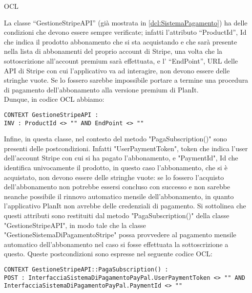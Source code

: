 \begin{listaPersonale}{OCL}
    \begin{center}
        
    \end{center}
    La classe “GestioneStripeAPI” (già mostrata in \ref{dcl:SistemaPagamento}) ha delle condizioni che devono essere sempre verificate; infatti l'attributo “ProductId”, Id che indica il prodotto abbonamento che si sta acquistando e che sarà presente nella lista di abbonamenti del proprio account di Stripe, una volta che la sottoscrizione all'account premium sarà effettuata, e l' “EndPoint”, URL delle API di Stripe con cui l'applicativo va ad interagire, non devono essere delle stringhe vuote. Se lo fossero sarebbe impossibile portare a termine una procedura di pagamento dell'abbonamento alla versione premium di PlanIt. \\
    Dunque, in codice OCL abbiamo:
    \begin{lstlisting}
CONTEXT GestioneStripeAPI :
INV : ProductId <> "" AND EndPoint <> ""
    \end{lstlisting}
    Infine, in questa classe, nel contesto del metodo "PagaSubscription()" sono presenti delle postcondizioni. Infatti "UserPaymentToken", token che indica l'user dell'account Stripe con cui si ha pagato l'abbonamento, e "PaymentId", Id che identifica univocamente il prodotto, in questo caso l'abbonamento, che si è acquistato, non devono essere delle stringhe vuote: se lo fossero l'acquisto dell'abbonamento non potrebbe essersi concluso con successo e non sarebbe neanche possibile il rinnovo automatico mensile dell'abbonamento, in quanto l'applicativo PlanIt non avrebbe delle credenziali di pagamento. Si sottolinea che questi attributi sono restituiti dal metodo "PagaSubscription()" della classe "GestioneStripeAPI", in modo tale che la classe "GestioneSistemaDiPagamentoStripe" possa provvedere al pagamento mensile automatico dell'abbonamento nel caso si fosse effettuata la sottoscrizione a questo.
    Queste postcondizioni sono espresse nel seguente codice OCL:
    \begin{lstlisting}
CONTEXT GestioneStripeAPI::PagaSubscription() :
POST : InterfacciaSistemaDiPagamentoPayPal.UserPaymentToken <> "" AND InterfacciaSistemaDiPagamentoPayPal.PaymentId <> ""
    \end{lstlisting}





\end{listaPersonale}
